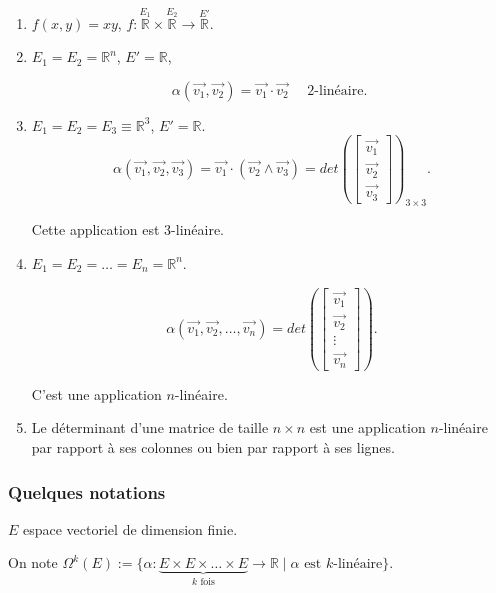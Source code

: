 \documentclass[french]{article}
\theoremstyle{definition}
\begin{document}
\begin{enumerate}
  \item $f(x,y) = xy$, $f : \stackrel{E_1}{\mathbb{R}} \times \stackrel{E_2}{\mathbb{R}} \to \stackrel{E'}{\mathbb{R}}$.
  \item $E_1 = E_2 = \mathbb{R}^n$, $E' = \mathbb{R}$,

  \[
  \alpha(\vec{ v_1 }, \vec{ v_2 } ) = \vec{ v_1 }\cdot \vec{ v_2 }\quad  \text{ 2-linéaire. }
  \]

  \item $E_1 = E_2 = E_3 \equiv \mathbb{R}^3$, $E' = \mathbb{R}$.
  \[
  \alpha(\vec{ v_1 }, \vec{ v_2 }, \vec{ v_3 }) = \vec{ v_1 } \cdot (\vec{ v_2 } \wedge \vec{ v_3 }  ) = det \left( \left[\begin{matrix}
  \vec{ v_1 } \\
  \vec{ v_2 }  \\
  \vec{ v_3 }
  \end{matrix}\right]\right)  _{3 \times 3}.
  \]

  Cette application est 3-linéaire.

  \item $E_1 = E_2 = \dots = E_n = \mathbb{R}^n$.

  \[
  \alpha(\vec{ v_1 }, \vec{ v_2 }, \dots, \vec{ v_n } ) = det \left(\left[\begin{matrix}
  \vec{ v_1 } \\
  \vec{ v_2 } \\
  \vdots \\
  \vec{ v_n }
  \end{matrix}\right]\right).
  \]

  C'est une application $n$-linéaire.

  \item Le déterminant d'une matrice de taille $n \times n$ est une application $n$-linéaire par rapport \`a ses colonnes ou bien par rapport \`a ses lignes.
\end{enumerate}




\subsubsection{Quelques notations}

$E$ espace vectoriel de dimension finie.

On note $\Omega ^{k}(E) := \{ \alpha : \underbrace{E \times E \times \dots \times E}_{k \text{ fois} }  \to \mathbb{R} \mid \alpha \text{ est } k \text{-linéaire}  \} $.
\end{document}
